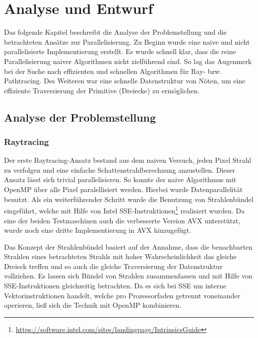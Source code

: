 
\newpage
\chapter{Analyse und Entwurf}
\label{ch:analyse}
Das folgende Kapitel beschreibt die Analyse der Problemstellung und die betrachteten Ansätze zur Parallelisierung. Zu Beginn wurde eine naive und nicht parallelisierte Implementierung erstellt. Es wurde schnell klar, dass die reine Parallelisierung naiver Algorithmen nicht zielführend sind. So lag das Augenmerk bei der Suche nach effizienten und schnellen Algorithmen für Ray- bzw. Pathtracing. Des Weiteren war eine schnelle Datenstruktur von Nöten, um eine effiziente Traversierung der Primitive (Dreiecke) zu ermöglichen.

\section{Analyse der Problemstellung}
\subsection{Raytracing}
\label{sec:ray_tracer}
Der erste Raytracing-Ansatz bestand aus dem naiven Versuch, jeden Pixel Strahl zu verfolgen und eine einfache Schattenstrahlberechnung anzustellen. Dieser Ansatz lässt sich trivial parallelisieren. So konnte der naive Algorithmus mit OpenMP über alle Pixel paralellisiert werden. Hierbei wurde Datenparallelität benutzt. Als ein weiterführender Schritt wurde die Benutzung von Strahlenbündel eingeführt, welche mit Hilfe von Intel SSE-Instruktionen\footnote{\url{https://software.intel.com/sites/landingpage/IntrinsicsGuide}} realisiert wurden. Da eine der beiden Testmaschinen auch die verbesserte Version AVX unterstützt, wurde noch eine dritte Implementierung in AVX hinzugefügt.

Das Konzept der Strahlenbündel basiert auf der Annahme, dass die benachbarten Strahlen eines betrachteten Strahls mit hoher Wahrscheinlichkeit das gleiche Dreieck treffen und so auch die gleiche Traversierung der Datenstruktur vollziehen. Es lassen sich Bündel von Strahlen zusammenfassen und mit Hilfe von SSE-Instruktionen gleichzeitig betrachten. Da es sich bei SSE um interne Vektorinstruktionen handelt, welche pro Prozessorfaden getrennt voneinander operieren, ließ sich die Technik mit OpenMP kombinieren.

